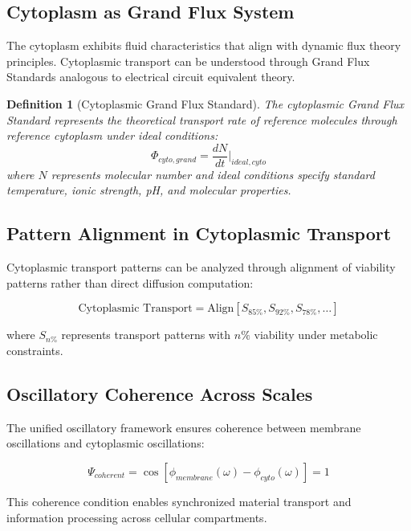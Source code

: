 \documentclass[12pt,a4paper]{article}
\newtheorem{definition}[theorem]{Definition}
\begin{document}
\subsection{Cytoplasm as Grand Flux System}

The cytoplasm exhibits fluid characteristics that align with dynamic flux theory principles. Cytoplasmic transport can be understood through Grand Flux Standards analogous to electrical circuit equivalent theory.

\begin{definition}[Cytoplasmic Grand Flux Standard]
The cytoplasmic Grand Flux Standard represents the theoretical transport rate of reference molecules through reference cytoplasm under ideal conditions:
\begin{equation}
\Phi_{cyto,grand} = \frac{dN}{dt}\bigg|_{ideal,cyto}
\end{equation}
where $N$ represents molecular number and ideal conditions specify standard temperature, ionic strength, pH, and molecular properties.
\end{definition}

\subsection{Pattern Alignment in Cytoplasmic Transport}

Cytoplasmic transport patterns can be analyzed through alignment of viability patterns rather than direct diffusion computation:

\begin{equation}
\text{Cytoplasmic Transport} = \text{Align}[S_{85\%}, S_{92\%}, S_{78\%}, \ldots]
\end{equation}

where $S_{n\%}$ represents transport patterns with $n\%$ viability under metabolic constraints.

\subsection{Oscillatory Coherence Across Scales}

The unified oscillatory framework ensures coherence between membrane oscillations and cytoplasmic oscillations:

\begin{equation}
\Psi_{coherent} = \cos[\phi_{membrane}(\omega) - \phi_{cyto}(\omega)] = 1
\end{equation}

This coherence condition enables synchronized material transport and information processing across cellular compartments.
\end{document}
